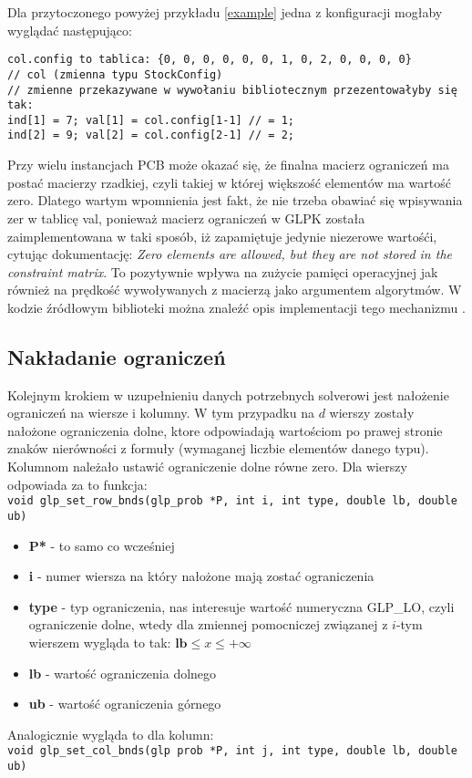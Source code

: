 Dla przytoczonego powyżej przykładu \ref{example} jedna z konfiguracji mogłaby wyglądać następująco:

\begin{lstlisting}
col.config to tablica: {0, 0, 0, 0, 0, 0, 1, 0, 2, 0, 0, 0, 0}            
// col (zmienna typu StockConfig)	
// zmienne przekazywane w wywołaniu bibliotecznym przezentowałyby się tak: 
ind[1] = 7; val[1] = col.config[1-1] // = 1; 
ind[2] = 9; val[2] = col.config[2-1] // = 2; 
\end{lstlisting}


Przy wielu instancjach PCB może okazać się, że finalna macierz ograniczeń ma postać macierzy rzadkiej, czyli takiej w której większość elementów ma wartość zero. Dlatego wartym wpomnienia jest fakt, że nie trzeba obawiać się wpisywania zer w tablicę val, ponieważ macierz ograniczeń w GLPK została zaimplementowana w taki sposób, iż zapamiętuje jedynie niezerowe wartośći, cytując dokumentację: \textit{Zero elements are allowed, but they are not stored in the constraint matrix}. To pozytywnie wpływa na zużycie pamięci operacyjnej jak również na prędkość wywoływanych z macierzą jako argumentem algorytmów. W kodzie źródłowym biblioteki można znaleźć opis implementacji tego mechanizmu \cite{GLPK_SRC}.

\subsection{Nakładanie ograniczeń}
Kolejnym krokiem w uzupełnieniu danych potrzebnych solverowi jest nałożenie ograniczeń na  wiersze i kolumny. W tym przypadku na $d$ wierszy zostały nałożone  ograniczenia dolne, ktore odpowiadają wartościom po prawej stronie znaków nierówności z formuły (wymaganej liczbie elementów danego typu). Kolumnom należało ustawić ograniczenie dolne równe zero.
Dla wierszy odpowiada za to funkcja: \\
\verb|void glp_set_row_bnds(glp_prob *P, int i, int type, double lb, double ub)|
\begin{itemize}
	\item \textbf{P*} - to samo co wcześniej
	\item \textbf{i} - numer wiersza na który nałożone mają zostać ograniczenia
	\item \textbf{type} - typ ograniczenia, nas interesuje wartość numeryczna GLP\_LO, czyli ograniczenie dolne, wtedy dla zmiennej pomocniczej związanej z $i$-tym wierszem wygląda to tak: $\mathbf{lb} \leq x \le +\infty$
	\item \textbf{lb} - wartość ograniczenia dolnego
	\item \textbf{ub} - wartość ograniczenia górnego
\end{itemize}
Analogicznie wygląda to dla kolumn: \\
\verb|void glp_set_col_bnds(glp prob *P, int j, int type, double lb, double ub)|

